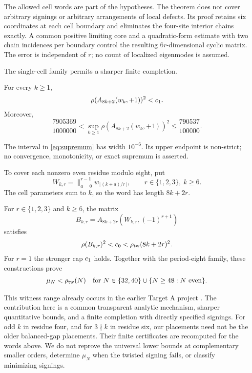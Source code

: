 The allowed cell words are part of the hypotheses. The theorem does not
cover arbitrary signings or arbitrary arrangements of local defects.
Its proof retains six coordinates at each cell boundary and eliminates the
four-site interior chains exactly. A common positive limiting core and a
quadratic-form estimate with two chain incidences per boundary control the
resulting $6r$-dimensional cyclic matrix. The error is independent of $r$;
no count of localized eigenmodes is assumed.

The single-cell family permits a sharper finite completion.
\begin{theorem}\label{thm:one-cell}
For every $k\ge1$,
\[
 \rho(A_{8k+2}(w_k,+1))^2<c_1.
\]
Moreover,
\begin{equation}
 \frac{7905369}{1000000}
 <\sup_{k\ge1}\rho(A_{8k+2}(w_k,+1))^2
 \le\frac{790537}{100000}.
 \label{eq:supremum}
\end{equation}
\end{theorem}
The interval in \eqref{eq:supremum} has width $10^{-6}$. Its upper endpoint
is non-strict; no convergence, monotonicity, or exact supremum is asserted.

To cover each nonzero even residue modulo eight, put
\[
 W_{k,r}=\mathop{\|}_{a=0}^{r-1}w_{\lfloor(k+a)/r\rfloor},
 \qquad r\in\{1,2,3\},\ k\ge6.
\]
The cell parameters sum to $k$, so the word has length $8k+2r$.
\begin{theorem}\label{thm:witnesses}
For $r\in\{1,2,3\}$ and $k\ge6$, the matrix
\[
 B_{k,r}=A_{8k+2r}(W_{k,r},(-1)^{r+1})
\]
satisfies
\begin{equation}
 \rho(B_{k,r})^2<c_0<\rho_{\mathrm{tw}}(8k+2r)^2.
 \label{eq:nonzero-witnesses}
\end{equation}
For $r=1$ the stronger cap $c_1$ holds. Together with the period-eight
family, these constructions prove
\[
 \mu_N<\rho_{\mathrm{tw}}(N)
 \quad\text{for }N\in\{32,40\}\cup\{N\ge48:N\text{ even}\}.
\]
\end{theorem}

This witness range already occurs in the earlier Target A project
\cite{EarlierTargetA}. The contribution here is a common transparent
analytic mechanism, sharper quantitative bounds, and a finite completion
with directly specified signings. For odd $k$ in residue four, and for
$3\nmid k$ in residue six, our placements need not be the older balanced-gap
placements. Their finite certificates are recomputed for the words above.
We do not reprove the universal lower bounds at complementary smaller
orders, determine $\mu_N$ when the twisted signing fails, or classify
minimizing signings.

